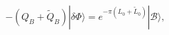 \begin{equation}\label{eq:QOnCounterTerm}
  -(Q_B+\tilde{Q}_B)  |\delta\Phi\rangle
 = e^{-\pi (L_0+\tilde{L}_0)} |\mathcal{B}\rangle,
\end{equation}

